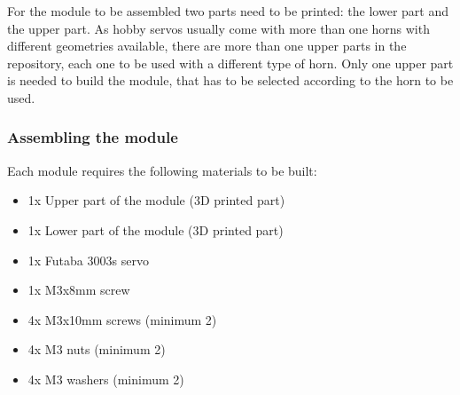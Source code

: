 For the module to be assembled two parts need to be printed: the lower part and the upper part. As hobby servos usually come with more than one horns with different geometries available, there are more than one upper parts in the repository, each one to be used with a different type of horn. Only one upper part is needed to build the module, that has to be selected according to the horn to be used.


\subsubsection{Assembling the module}

\noindent
Each module requires the following materials to be built:
\begin{itemize}
	\item 1x Upper part of the module (3D printed part)
	\item 1x Lower part of the module (3D printed part)
	\item 1x Futaba 3003s servo
	\item 1x M3x8mm screw
	\item 4x M3x10mm screws (minimum 2)
	\item 4x M3 nuts (minimum 2)
	\item 4x M3 washers (minimum 2)
\end{itemize}

\newpage

